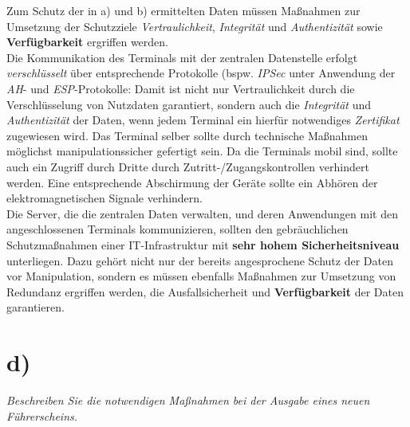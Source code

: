 \noindent
Zum Schutz der in a) und b) ermittelten Daten müssen Maßnahmen zur Umsetzung der Schutzziele \textit{Vertraulichkeit}, \textit{Integrität} und \textit{Authentizität} sowie \textbf{Verfügbarkeit} ergriffen werden.\\

\noindent
 Die Kommunikation des Terminals mit der zentralen Datenstelle erfolgt \textit{verschlüsselt} über entsprechende Protokolle (bspw. \textit{IPSec} unter Anwendung der \textit{AH}- und \textit{ESP}-Protokolle: Damit ist nicht nur Vertraulichkeit durch die Verschlüsselung von Nutzdaten garantiert, sondern auch die \textit{Integrität} und \textit{Authentizität} der Daten, wenn jedem Terminal ein hierfür notwendiges \textit{Zertifikat} zugewiesen wird.
Das Terminal selber sollte durch technische Maßnahmen möglichst manipulationssicher gefertigt sein.
Da die Terminals mobil sind, sollte auch ein Zugriff durch Dritte durch Zutritt-/Zugangskontrollen verhindert werden.
Eine entsprechende Abschirmung der Geräte sollte ein Abhören der elektromagnetischen Signale verhindern.\\

\noindent
Die Server, die die zentralen Daten verwalten, und deren Anwendungen mit den angeschlossenen Terminals kommunizieren, sollten den gebräuchlichen Schutzmaßnahmen einer IT-Infrastruktur mit \textbf{sehr hohem Sicherheitsniveau} unterliegen.
Dazu gehört nicht nur der bereits angesprochene Schutz der Daten vor Manipulation, sondern es müssen ebenfalls Maßnahmen zur Umsetzung von Redundanz ergriffen werden, die Ausfallsicherheit und \textbf{Verfügbarkeit} der Daten garantieren.

\section{d)}

\textit{Beschreiben Sie die notwendigen Maßnahmen bei der Ausgabe eines neuen Führerscheins.}

